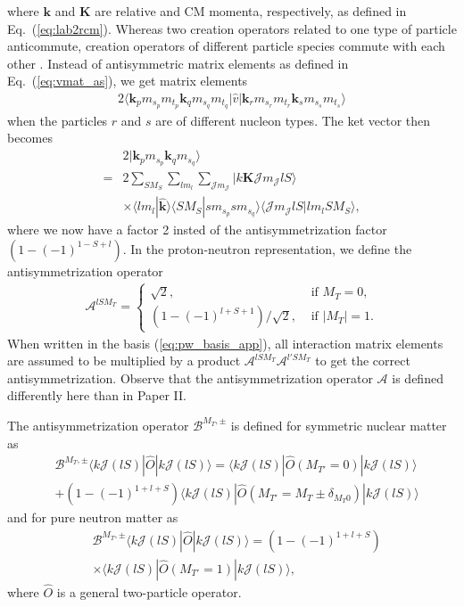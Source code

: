 \documentclass[a4paper,12pt]{report}
\begin{document}
where $\mathbf{k}$ and $\mathbf{K}$ are relative and CM momenta, respectively, as defined in Eq.~(\ref{eq:lab2rcm}). Whereas two creation operators related to one type of particle anticommute, creation operators of different particle species commute with each other \cite{bishop_lahoz_1987}. Instead of antisymmetric matrix elements as defined in Eq.~(\ref{eq:vmat_as}), we get matrix elements
\begin{align}
  2\langle \mathbf{k}_{p}m_{s_{p}}m_{t_{p}}\mathbf{k}_{q}m_{s_{q}}m_{t_{q}}|\hat{v}|\mathbf{k}_{r}m_{s_{r}}m_{t_{r}}\mathbf{k}_{s}m_{s_{s}}m_{t_{s}}\rangle
\end{align} 
when the particles $r$ and $s$ are of different nucleon types. The ket vector then becomes
\begin{align}
  & 2|\mathbf{k}_{p}m_{s_{p}}\mathbf{k}_{q}m_{s_{q}}\rangle \nonumber \\
  = & 2\sum_{SM_{S}}\sum_{lm_{l}}\sum_{\mathcal{J}m_{\mathcal{J}}} |k\mathbf{K}\mathcal{J}m_{\mathcal{J}}lS\rangle \nonumber \\
  & \times \langle lm_{l}|\mathbf{\hat{k}}\rangle \langle SM_{S}|sm_{s_{p}}sm_{s_{q}}\rangle \langle \mathcal{J}m_{\mathcal{J}}lS|lm_{l}SM_{S}\rangle ,
\end{align}
where we now have a factor 2 insted of the antisymmetrization 
factor $(1-(-1)^{1-S+l})$. In the proton-neutron representation, 
we define the antisymmetrization operator
\begin{align}
  \mathcal{A}^{lSM_{T}} = \left\{ \begin{array}{ll}
    \sqrt{2}, & \text{ if } M_{T} = 0, \\
    \left( 1-(-1)^{l+S+1}\right)/\sqrt{2}, 
    & \text{ if } |M_{T}| = 1.
  \end{array} \right.
  \label{eq:antisymm_app}
\end{align}
When written in the basis (\ref{eq:pw_basis_app}), all 
interaction matrix elements are assumed to be multiplied by 
a product $\mathcal{A}^{lSM_{T}}\mathcal{A}^{l'SM_{T}}$ to get 
the correct antisymmetrization. Observe that the 
antisymmetrization operator $\mathcal{A}$ is defined 
differently here than in Paper II.

The antisymmetrization operator $\mathcal{B}^{M_{T}, \pm }$ is defined for symmetric nuclear matter as
\begin{align}
  & \mathcal{B}^{M_{T}, \pm }\langle k\mathcal{J}(lS)|\hat{O}|k\mathcal{J}(lS)\rangle = \langle k\mathcal{J}(lS)|\hat{O}(M_{T'}=0)|k\mathcal{J}(lS)\rangle \nonumber \\
  & + \left(1 - (-1)^{1+l+S}\right)\langle k\mathcal{J}(lS)|\hat{O}(M_{T'}=M_{T}\pm \delta_{M_{T}0})|k\mathcal{J}(lS)\rangle 
  \label{eq:bopsnm}
\end{align}
and for pure neutron matter as
\begin{align}
  & \mathcal{B}^{M_{T}, \pm }\langle k\mathcal{J}(lS)|\hat{O}|k\mathcal{J}(lS)\rangle = \left(1 - (-1)^{1+l+S}\right) \nonumber \\
  &\times \langle k\mathcal{J}(lS)|\hat{O}(M_{T'}=1)|k\mathcal{J}(lS)\rangle ,
  \label{eq:boppnm}
\end{align}
where $\hat{O}$ is a general two-particle operator. 
\end{document}
